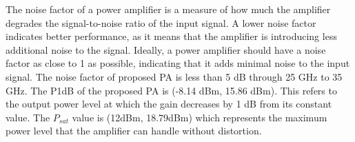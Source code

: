 The noise factor of a power amplifier is a measure of how much the amplifier degrades the signal-to-noise ratio of the input signal. A lower noise factor indicates better performance, as it means that the amplifier is introducing less additional noise to the signal. Ideally, a power amplifier should have a noise factor as close to 1 as possible, indicating that it adds minimal noise to the input signal. The noise factor of proposed PA is less than 5 dB through 25 GHz to 35 GHz. The P1dB of the proposed PA is (-8.14 dBm,
15.86 dBm). This refers to the output power level at which the gain decreases by
1 dB from its constant value. The $P_{sat}$ value is (12dBm, 18.79dBm) which represents the maximum power level that the amplifier can handle without distortion.
